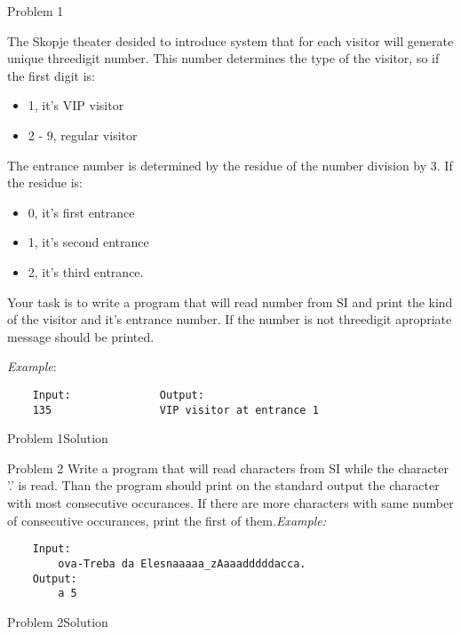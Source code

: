 
\begin{frame}[fragile]{Problem 1}
\begin{tiny}
The Skopje theater desided to introduce system that for each visitor will
generate unique threedigit number. This number determines the type of the
visitor, so if the first digit is:
\begin{itemize}
  \item 1, it's VIP visitor
  \item 2 - 9, regular visitor  
\end{itemize}

The entrance number is determined by the residue of the number division by 3.
If the residue is: 
\begin{itemize}
  \item 0, it's first entrance
  \item 1, it's second entrance
  \item 2, it's third entrance.  
\end{itemize}
Your task is to write a program that will read number from SI and print the kind
of the visitor and it's entrance number. If the number is not threedigit
apropriate message should be printed.


\emph{Example}:
\begin{verbatim}
	Input:				Output:
    135				    VIP visitor at entrance 1
\end{verbatim}
\end{tiny}

\end{frame}

\begin{frame}[fragile]{Problem 1}{Solution}

\end{frame}

\begin{frame}[fragile]{Problem 2}
Write a program that will read characters from SI while the character '.' is
read. Than the program should print on the standard output the character with
most consecutive occurances. If there are more characters with same number of
consecutive occurances, print the first of them.\emph{Example:}
\begin{verbatim}
	Input:				
		ova-Treba da Elesnaaaaa_zAaaadddddacca.
	Output: 
		a 5
\end{verbatim}
\end{frame}
\begin{frame}[fragile,shrink=.95]{Problem 2}{Solution}

\end{frame}



